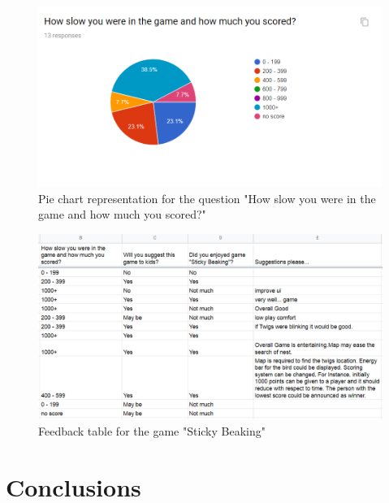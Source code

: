 \documentclass[12pt]{article}
\begin{document}
\begin{figure}[H]
\centering
\includegraphics [scale=0.7]{w.png}
\caption{Pie chart representation for the question "How slow you were in the game and how much you scored?" }
\label{score}
\end{figure}

\begin{figure}[H]
    \centering
    \includegraphics [scale=0.7]{feedback_table.png}
    \caption{Feedback table for the game "Sticky Beaking"}
    \label{feedback}
\end{figure}


\section{Conclusions}
\end{document}
